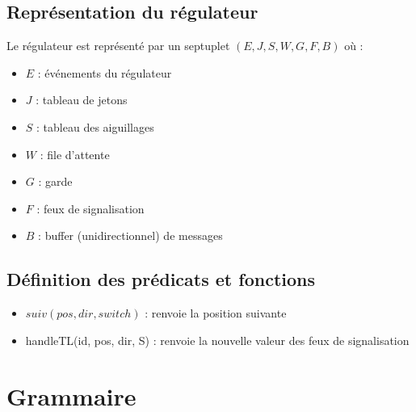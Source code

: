 \documentclass[12pt]{article}
\begin{document}
\subsection{Représentation du régulateur}
Le régulateur est représenté par un septuplet $(E, J, S, W, G, F, B)$ où :
\begin{itemize}
    \item $E$ : événements du régulateur
    \item $J$ : tableau de jetons
    \item $S$ : tableau des aiguillages
    \item $W$ : file d'attente
    \item $G$ : garde
    \item $F$ : feux de signalisation
    \item $B$ : buffer (unidirectionnel) de messages
\end{itemize}

\subsection{Définition des prédicats et fonctions}

\begin{itemize}
    \item $suiv(pos, dir, switch)$ : renvoie la position suivante 
    \item handleTL(id, {\color{Red}pos, dir}, S) : renvoie la nouvelle valeur des feux de signalisation 
\end{itemize}


\section{Grammaire}



\begin{grammar}
    \otherform{\varepsilon }{}
\end{grammar}

\vspace{0.5cm}

\begin{grammar}
    \otherform{\varepsilon}{}

\end{grammar}
\end{document}
